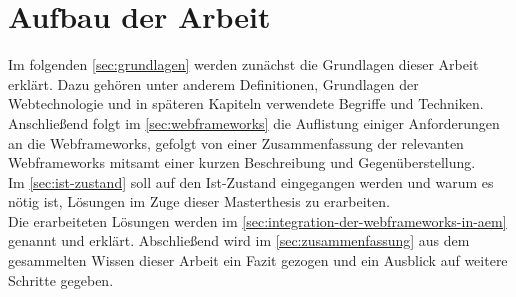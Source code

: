 \section{Aufbau der Arbeit}
Im folgenden \autoref{sec:grundlagen} werden zunächst die Grundlagen dieser Arbeit erklärt. Dazu gehören unter anderem Definitionen, Grundlagen der Webtechnologie und in späteren Kapiteln verwendete Begriffe und Techniken.\\
Anschließend folgt im \autoref{sec:webframeworks} die Auflistung einiger Anforderungen an die Webframeworks, gefolgt von einer Zusammenfassung der relevanten Webframeworks mitsamt einer kurzen Beschreibung und Gegenüberstellung.\\
Im \autoref{sec:ist-zustand} soll auf den Ist-Zustand eingegangen werden und warum es nötig ist, Lösungen im Zuge dieser Masterthesis zu erarbeiten. \\ 
Die erarbeiteten Lösungen werden im \autoref{sec:integration-der-webframeworks-in-aem} genannt und erklärt.
Abschließend wird im \autoref{sec:zusammenfassung} aus dem gesammelten Wissen dieser Arbeit ein Fazit gezogen und ein Ausblick auf weitere Schritte gegeben.